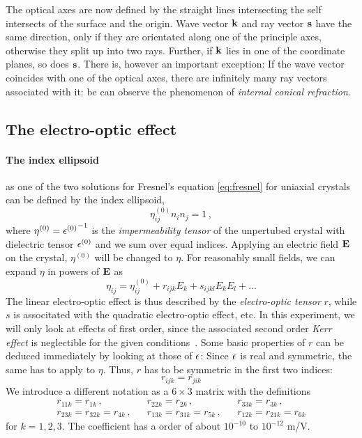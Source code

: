 The optical axes are now defined by the straight lines intersecting 
the self intersects of the surface and the origin. 
Wave vector $\mathbf{k}$ and ray vector $\mathbf{s}$ have the same direction, 
only if they are orientated along one of the principle axes, 
otherwise they split up into two rays. 
Further, if $\mathbf{k}$ lies in one of the coordinate planes, so does $\mathbf{s}$.
There is, however an important exception: If the wave vector 
coincides with one of the optical axes, there are 
infinitely many ray vectors associated with it:
be can observe the phenomenon of 
\emph{internal conical refraction}. 
\FloatBarrier

\subsection{The electro-optic effect}
\paragraph{The index ellipsoid} 
as one of the two solutions for Fresnel's equation 
\eqref{eq:fresnel} for uniaxial crystals can be defined by the 
index ellipsoid, 
\begin{equation}
    \eta_{ij}^{(0)} n_i n_j = 1 \, ,
\end{equation}
where $\eta^{(0)} = {\epsilon^{(0)}}^{-1}$ is the \emph{impermeability 
tensor} of the unpertubed crystal with dielectric tensor $\epsilon^{(0)}$ 
and we sum over equal indices. 
Applying an electric field $\mathbf{E}$ on the crystal, $\eta^{(0)}$ will be 
changed to $\eta$. For reasonably small fields, we can expand
$\eta$ in powers of $\mathbf{E}$ as 
\begin{equation}
    \eta_{ij} = \eta_{ij}^{(0)} + r_{ijk} E_k + s_{ijkl} E_k E_l + \ldots
\end{equation}
The linear electro-optic effect is thus described by the 
\emph{electro-optic tensor} $r$, while 
$s$ is associtated with the quadratic electro-optic effect, etc. 
In this experiment, we will only look at effects of first order, 
since the associated second order \emph{Kerr effect} is 
neglectible for the given conditions~\cite{staatsexamen}.
Some basic properties of $r$ can be deduced immediately by 
looking at those of $\epsilon$: Since $\epsilon$ is real and symmetric, the 
same has to apply to $\eta$. Thus, $r$ has to be symmetric in the 
first two indices:
\begin{equation}
    r_{ijk} = r_{jik}
\end{equation}
We introduce a different notation as a $6 \times 3$ matrix with the definitions 
\begin{align}
    &r_{11k} = r_{1k}\, ,&
    &r_{22k} = r_{2k}\, ,&
    &r_{33k} = r_{3k}\, ,& \nonumber \\
    &r_{23k} = r_{32k} = r_{4k}\, ,& 
    &r_{13k} = r_{31k} = r_{5k}\, ,&
    &r_{12k} = r_{21k} = r_{6k} &
    \label{eq:notation}
\end{align}
for $k = 1, 2, 3$. The coefficient has a order of about 
$10^{-10}$ to $10^{-12}$ m/V.~\cite{sauter1996nonlinear}

